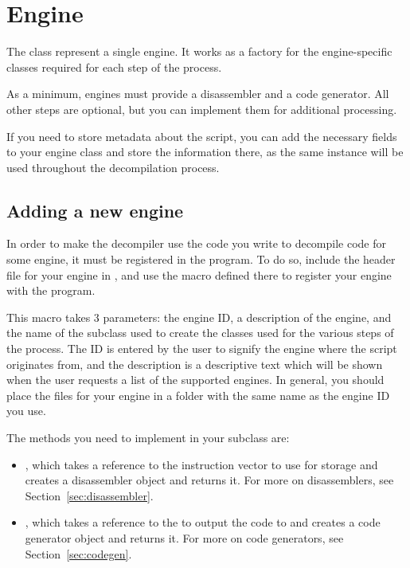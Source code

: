 \newpage\section{Engine}
The  class represent a single engine. It works as a factory for the engine-specific classes required for each step of the process.

As a minimum, engines must provide a disassembler and a code generator. All other steps are optional, but you can implement them for additional processing.

If you need to store metadata about the script, you can add the necessary fields to your engine class and store the information there, as the same instance will be used throughout the decompilation process.

\subsection{Adding a new engine}
\label{sec:addingengine}
In order to make the decompiler use the code you write to decompile code for some engine, it must be registered in the program. To do so, include the header file for your engine in , and use the  macro defined there to register your engine with the program.

This macro takes 3 parameters: the engine ID, a description of the engine, and the name of the  subclass used to create the classes used for the various steps of the process. The ID is entered by the user to signify the engine where the script originates from, and the description is a descriptive text which will be shown when the user requests a list of the supported engines. In general, you should place the files for your engine in a folder with the same name as the engine ID you use.

The methods you need to implement in your  subclass are:
\begin{itemize}
\item {}, which takes a reference to the instruction vector to use for storage and creates a disassembler object and returns it. For more on disassemblers, see Section~\vref{sec:disassembler}.
\item {}, which takes a reference to the  to output the code to and creates a code generator object and returns it. For more on code generators, see Section~\vref{sec:codegen}.
\end{itemize}

